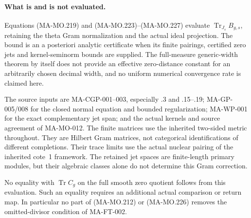 \paragraph{What is and is not evaluated.}
Equations (MA-MO.219) and (MA-MO.223)--(MA-MO.227) evaluate
\(\operatorname{Tr}_{J_s}B_{g,s}\), retaining the theta Gram
normalization and the actual ideal projection.  The bound is
an a posteriori analytic certificate when its finite pairings,
certified zero jets and kernel-seminorm bounds are supplied.
The full-measure generic-width theorem by itself does not
provide an effective zero-distance constant for an arbitrarily
chosen decimal width, and no uniform numerical convergence
rate is claimed here.

The source inputs are MA-CGP-001--003, especially .3 and
.15--.19; MA-GP-005/008 for the closed normal equation and
bounded regularization; MA-WP-001 for the exact complementary
jet span; and the actual kernels and source agreement of
MA-MO-012.  The finite matrices use the inherited two-sided
metric throughout.  They are Hilbert Gram matrices, not
categorical identifications of different completions.  Their
trace limits use the actual nuclear pairing of the inherited
cote~1 framework.  The retained jet spaces are finite-length
primary modules, but their algebraic classes alone do not
determine this Gram correction.

No equality with \(\operatorname{Tr}C_g\) on the full smooth
zero quotient follows from this evaluation.  Such an equality
requires an additional actual comparison or return map.
In particular no part of (MA-MO.212) or (MA-MO.226) removes
the omitted-divisor condition of MA-FT-002.
